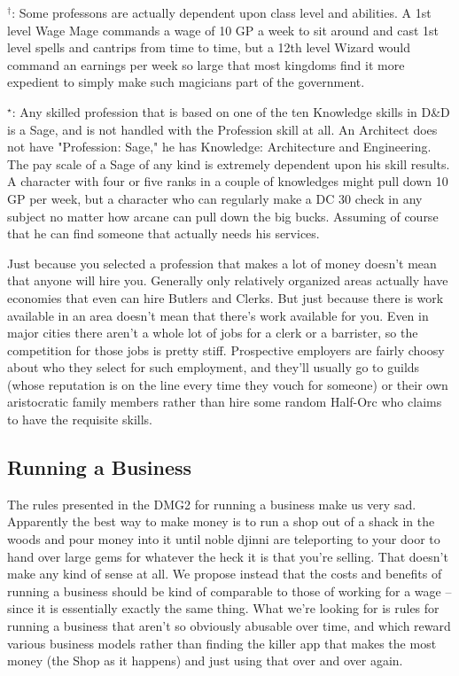 \begin{multicols}{2}
\begin{small}
\noindent $^\dagger$: Some professons are actually dependent upon class level and abilities. A 1st level Wage Mage commands a wage of 10 GP a week to sit around and cast 1st level spells and cantrips from time to time, but a 12th level Wizard would command an earnings per week so large that most kingdoms find it more expedient to simply make such magicians part of the government.

\noindent $^\star$: Any skilled profession that is based on one of the ten Knowledge skills in D\&D is a Sage, and is not handled with the Profession skill at all. An Architect does not have "Profession: Sage," he has Knowledge: Architecture and Engineering. The pay scale of a Sage of any kind is extremely dependent upon his skill results. A character with four or five ranks in a couple of knowledges might pull down 10 GP per week, but a character who can regularly make a DC 30 check in any subject no matter how arcane can pull down the big bucks. Assuming of course that he can find someone that actually needs his services.
\end{small}
\end{multicols}


Just because you selected a profession that makes a lot of money doesn't mean that anyone will hire you. Generally only relatively organized areas actually have economies that even can hire Butlers and Clerks. But just because there is work available in an area doesn't mean that there's work available for you. Even in major cities there aren't a whole lot of jobs for a clerk or a barrister, so the competition for those jobs is pretty stiff. Prospective employers are fairly choosy about who they select for such employment, and they'll usually go to guilds (whose reputation is on the line every time they vouch for someone) or their own aristocratic family members rather than hire some random Half-Orc who claims to have the requisite skills.

\subsection{Running a Business}

The rules presented in the DMG2 for running a business make us very sad. Apparently the best way to make money is to run a shop out of a shack in the woods and pour money into it until noble djinni are teleporting to your door to hand over large gems for whatever the heck it is that you're selling. That doesn't make any kind of sense at all. We propose instead that the costs and benefits of running a business should be kind of comparable to those of working for a wage -- since it is essentially exactly the same thing. What we're looking for is rules for running a business that aren't so obviously abusable over time, and which reward various business models rather than finding the killer app that makes the most money (the Shop as it happens) and just using that over and over again.

